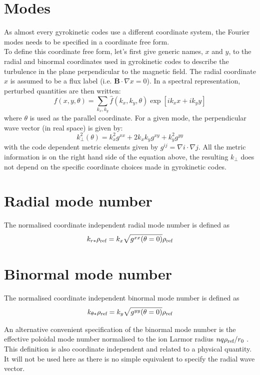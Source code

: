\documentclass[fleqn]{report}
\begin{document}
\section{Modes}
As almost every gyrokinetic codes use a different coordinate system, the Fourier modes needs to be specified in a coordinate free form.\\
To define this coordinate free form, let's first give generic names, $x$ and $y$, to the radial and binormal coordinates used in gyrokinetic codes to describe the turbulence in the plane perpendicular to the magnetic field. The radial coordinate $x$ is assumed to be a flux label (i.e. $\mathbf{B}\cdot \nabla x =0$).
In a spectral representation, perturbed quantities are then written:
\begin{equation}
 f(x,y,\theta) = \sum_{k_x,k_y} \hat{f}(k_x,k_y,\theta)\exp[ik_x x + ik_y y] 
\end{equation}
where $\theta$ is used as the parallel coordinate.
For a given mode, the perpendicular wave vector (in real space) is given by:
\begin{equation}
 k_\perp^2(\theta) = k_x^2 g^{xx} + 2k_xk_y g^{xy} + k_y^2g^{yy}
\end{equation}
with the code dependent metric elements given by $g^{ij}=\nabla i \cdot \nabla j$. All the metric information is on the right hand side of the equation above, the resulting $k_\perp$ does not depend on the specific coordinate choices made in gyrokinetic codes.

\section{Radial mode number}
The normalised coordinate independent radial mode number is defined as
\begin{equation}
 k_{r*}\rho_{\textrm{ref}} = k_x \sqrt{g^{xx}(\theta=0)} \rho_{\textrm{ref}}
\end{equation}

\section{Binormal mode number}
The normalised coordinate independent binormal mode number is defined as
\begin{equation}
 k_{\theta*}\rho_{\textrm{ref}} = k_y \sqrt{g^{yy}(\theta=0)} \rho_{\textrm{ref}}
\end{equation}

An alternative convenient specification of the binormal mode number is the effective poloidal mode number normalised to the ion Larmor radius  $nq\rho_{\textrm{ref}}/r_0$  \cite{Merlo:sub2014}. This definition is also coordinate independent and related to a physical quantity. It will not be used here as there is no simple equivalent to specify the radial wave vector.
\end{document}
